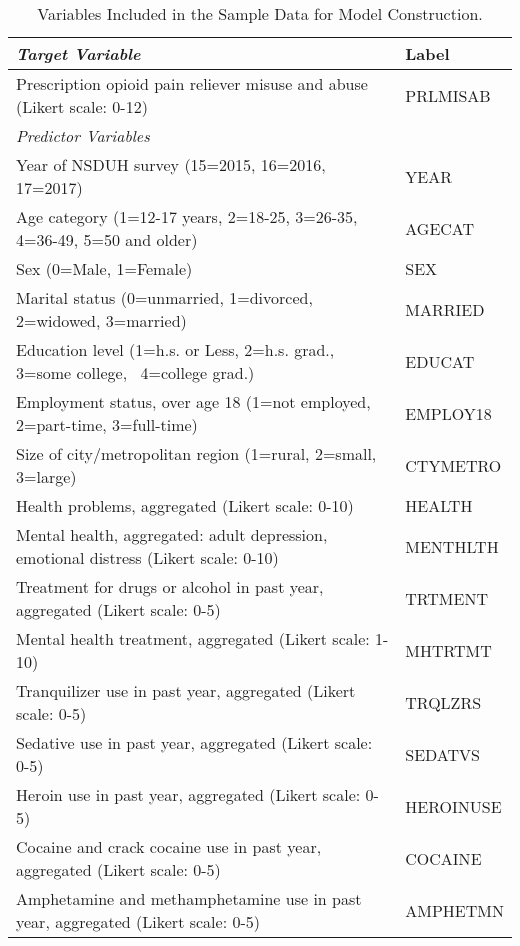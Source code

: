 \documentclass[sigconf]{acmart}
\begin{document}
\begin{table*}[ht]
  \caption{Variables Included in the Sample Data for Model Construction.}
  \label{tab:freq}
  \begin{tabular}{ll}
    \toprule
    \textit{Target Variable} & Label \\
    \midrule
    Prescription opioid pain reliever misuse and abuse 
    (Likert scale: 0-12)& PRLMISAB  \\
    \midrule
    \textit{Predictor Variables}&   \\
    \midrule
    Year of NSDUH survey (15=2015, 16=2016, 17=2017) & YEAR  \\
    Age category (1=12-17 years, 2=18-25, 3=26-35, 4=36-49, 5=50 and older)& AGECAT \\
    Sex (0=Male, 1=Female)& SEX  \\
    Marital status (0=unmarried, 1=divorced, 2=widowed, 3=married)& MARRIED  \\
    Education level (1=h.s. or Less, 2=h.s. grad., 3=some college,  4=college grad.)& EDUCAT  \\
    Employment status, over age 18 (1=not employed, 2=part-time, 3=full-time) & EMPLOY18  \\
    Size of city/metropolitan region (1=rural, 2=small, 3=large)& CTYMETRO  \\
    Health problems, aggregated  (Likert scale: 0-10)& HEALTH  \\
    Mental health, aggregated: adult depression, emotional distress 
    (Likert scale: 0-10)& MENTHLTH  \\
    Treatment for drugs or alcohol in past year, aggregated 
    (Likert scale: 0-5)& TRTMENT  \\
    Mental health treatment, aggregated (Likert scale: 1-10)& MHTRTMT  \\
    Tranquilizer use in past year, aggregated (Likert scale: 0-5)& TRQLZRS \\
    Sedative use in past year, aggregated (Likert scale: 0-5)& SEDATVS  \\
    Heroin use in past year, aggregated (Likert scale: 0-5)& HEROINUSE  \\
    Cocaine and crack cocaine use in past year, aggregated  
    (Likert scale: 0-5)& COCAINE  \\
    Amphetamine and methamphetamine use in past year, aggregated 
    (Likert scale: 0-5)& AMPHETMN  \\
    \bottomrule
  \end{tabular}
\end{table*}
\end{document}

